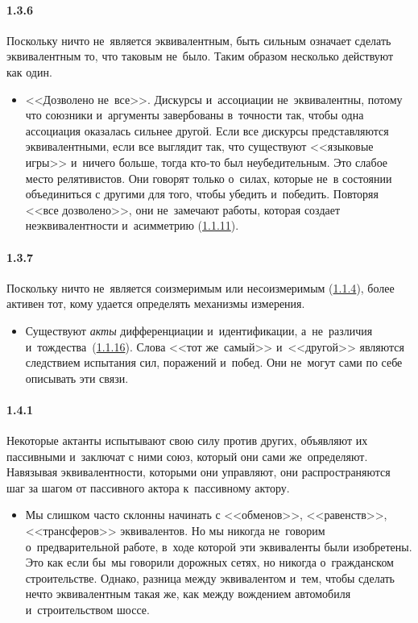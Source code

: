 \paragraph{1.3.6}\hypertarget{par:1.3.6}{} Поскольку ничто не~является эквивалентным, быть сильным означает сделать эквивалентным то, что таковым не~было. Таким образом несколько действуют как один.
	\begin{itemize}
	\item <<Дозволено не~все>>. Дискурсы и~ассоциации не~эквивалентны, потому что союзники и~аргументы завербованы в~точности так, чтобы одна ассоциация оказалась сильнее другой. Если все дискурсы представляются эквивалентными, если все выглядит так, что существуют <<языковые игры>> и~ничего больше, тогда кто-то был неубедительным. Это слабое место релятивистов. Они говорят только о~силах, которые не~в состоянии объединиться с другими для того, чтобы убедить и~победить. Повторяя <<все дозволено>>, они не~замечают работы, которая создает неэквивалентности и~асимметрию (\hyperlink{par:1.1.11}{1.1.11}).
	\end{itemize}

\paragraph{1.3.7}\hypertarget{par:1.3.7}{} Поскольку ничто не~является соизмеримым или несоизмеримым (\hyperlink{par:1.1.4}{1.1.4}), более активен тот, кому удается определять механизмы измерения.
	\begin{itemize}
	\item Существуют {\itshape акты} дифференциации и~идентификации, а~не~различия и~тождества~(\hyperlink{par:1.1.16}{1.1.16}). Слова <<тот же~самый>> и~<<другой>> являются следствием испытания сил, поражений и~побед. Они не~могут сами по себе описывать эти связи.
	\end{itemize}


\paragraph{1.4.1}\hypertarget{par:1.4.1}{} Некоторые актанты испытывают свою силу против других, объявляют их пассивными и~заключат с ними союз, который они сами же~определяют. Навязывая эквивалентности, которыми они управляют, они распространяются шаг за шагом от пассивного актора к~пассивному актору.
	\begin{itemize}
	\item Мы слишком часто склонны начинать с <<обменов>>, <<равенств>>, <<трансферов>> эквивалентов. Но мы никогда не~говорим о~предварительной работе, в~ходе которой эти эквиваленты были изобретены. Это как если бы~мы говорили дорожных сетях, но никогда о~гражданском строительстве. Однако, разница между эквивалентом и~тем, чтобы сделать нечто эквивалентным такая же, как между вождением автомобиля и~строительством шоссе.
	\end{itemize}

